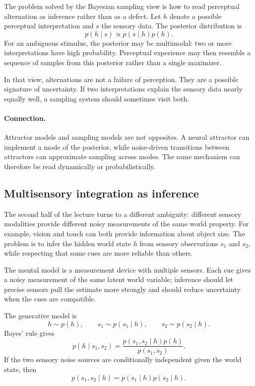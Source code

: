 The problem solved by the Bayesian sampling view is how to read perceptual alternation as inference rather than as a defect. Let \(h\) denote a possible perceptual interpretation and \(s\) the sensory data. The posterior distribution is
\[
p(h\mid s)
\propto
p(s\mid h)p(h).
\]
For an ambiguous stimulus, the posterior may be multimodal: two or more interpretations have high probability. Perceptual experience may then resemble a sequence of samples from this posterior rather than a single maximizer.

In that view, alternations are not a failure of perception. They are a possible signature of uncertainty. If two interpretations explain the sensory data nearly equally well, a sampling system should sometimes visit both.

\paragraph{Connection.}
Attractor models and sampling models are not opposites. A neural attractor can implement a mode of the posterior, while noise-driven transitions between attractors can approximate sampling across modes. The same mechanism can therefore be read dynamically or probabilistically.

\subsection{Multisensory integration as inference}

The second half of the lecture turns to a different ambiguity: different sensory modalities provide different noisy measurements of the same world property. For example, vision and touch can both provide information about object size. The problem is to infer the hidden world state \(h\) from sensory observations \(s_1\) and \(s_2\), while respecting that some cues are more reliable than others.

The mental model is a measurement device with multiple sensors. Each cue gives a noisy measurement of the same latent world variable; inference should let precise sensors pull the estimate more strongly and should reduce uncertainty when the cues are compatible.

The generative model is
\[
h \sim p(h),
\qquad
s_1 \sim p(s_1\mid h),
\qquad
s_2 \sim p(s_2\mid h).
\]
Bayes' rule gives
\[
p(h\mid s_1,s_2)
=
\frac{p(s_1,s_2\mid h)p(h)}
{p(s_1,s_2)}.
\]
If the two sensory noise sources are conditionally independent given the world state, then
\[
p(s_1,s_2\mid h)
=
p(s_1\mid h)p(s_2\mid h).
\]

